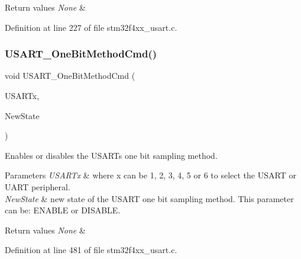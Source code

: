 \begin{DoxyRetVals}{Return values}
{\em None} & \\
\hline
\end{DoxyRetVals}


Definition at line 227 of file stm32f4xx\+\_\+usart.\+c.

\mbox{\label{group___u_s_a_r_t___group1_ga3ed89ea8765d851510cfe90f7d90cbbb}} 
\subsubsection{\texorpdfstring{U\+S\+A\+R\+T\+\_\+\+One\+Bit\+Method\+Cmd()}{USART\_OneBitMethodCmd()}}
{\footnotesize\ttfamily void U\+S\+A\+R\+T\+\_\+\+One\+Bit\+Method\+Cmd (\begin{DoxyParamCaption}\item[{\hyperlink{struct_u_s_a_r_t___type_def}{U\+S\+A\+R\+T\+\_\+\+Type\+Def} $\ast$}]{U\+S\+A\+R\+Tx,  }\item[{Functional\+State}]{New\+State }\end{DoxyParamCaption})}



Enables or disables the U\+S\+A\+RT\textquotesingle{}s one bit sampling method. 


\begin{DoxyParams}{Parameters}
{\em U\+S\+A\+R\+Tx} & where x can be 1, 2, 3, 4, 5 or 6 to select the U\+S\+A\+RT or U\+A\+RT peripheral. \\
\hline
{\em New\+State} & new state of the U\+S\+A\+RT one bit sampling method. This parameter can be\+: E\+N\+A\+B\+LE or D\+I\+S\+A\+B\+LE. \\
\hline
\end{DoxyParams}

\begin{DoxyRetVals}{Return values}
{\em None} & \\
\hline
\end{DoxyRetVals}


Definition at line 481 of file stm32f4xx\+\_\+usart.\+c.

